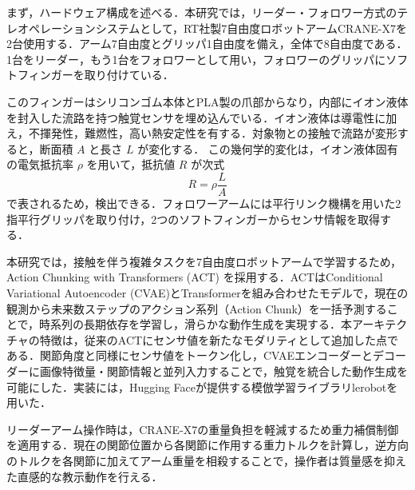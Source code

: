 まず，ハードウェア構成を述べる．本研究では，リーダー・フォロワー方式のテレオペレーションシステムとして，RT社製7自由度ロボットアームCRANE-X7を2台使用する．アーム7自由度とグリッパ1自由度を備え，全体で8自由度である．1台をリーダー，もう1台をフォロワーとして用い，フォロワーのグリッパにソフトフィンガーを取り付けている．\par
このフィンガーはシリコンゴム本体とPLA製の爪部からなり，内部にイオン液体を封入した流路を持つ触覚センサを埋め込んでいる．イオン液体は導電性に加え，不揮発性，難燃性，高い熱安定性を有する\cite{armandIonicliquidMaterialsElectrochemical2009}．対象物との接触で流路が変形すると，断面積 $A$ と長さ $L$ が変化する．
この幾何学的変化は，イオン液体固有の電気抵抗率 $\rho$ を用いて，抵抗値 $R$ が次式
\begin{equation}
  R = \rho \frac{L}{A}
\end{equation}
で表されるため，検出できる\cite{chossatSoftStrainSensor2013}．フォロワーアームには平行リンク機構を用いた2指平行グリッパを取り付け，2つのソフトフィンガーからセンサ情報を取得する．\par
本研究では，接触を伴う複雑タスクを7自由度ロボットアームで学習するため，Action Chunking with Transformers (ACT) \cite{zhaoLearningFineGrainedBimanual2023}を採用する．ACTはConditional Variational Autoencoder (CVAE)とTransformerを組み合わせたモデルで，現在の観測から未来数ステップのアクション系列（Action Chunk）を一括予測することで，時系列の長期依存を学習し，滑らかな動作生成を実現する．本アーキテクチャの特徴は，従来のACTにセンサ値を新たなモダリティとして追加した点である．関節角度と同様にセンサ値をトークン化し，CVAEエンコーダーとデコーダーに画像特徴量・関節情報と並列入力することで，触覚を統合した動作生成を可能にした．実装には，Hugging Faceが提供する模倣学習ライブラリlerobot\cite{cadene2024lerobot}を用いた．\par
リーダーアーム操作時は，CRANE-X7の重量負担を軽減するため重力補償制御を適用する．現在の関節位置から各関節に作用する重力トルクを計算し，逆方向のトルクを各関節に加えてアーム重量を相殺することで，操作者は質量感を抑えた直感的な教示動作を行える．
